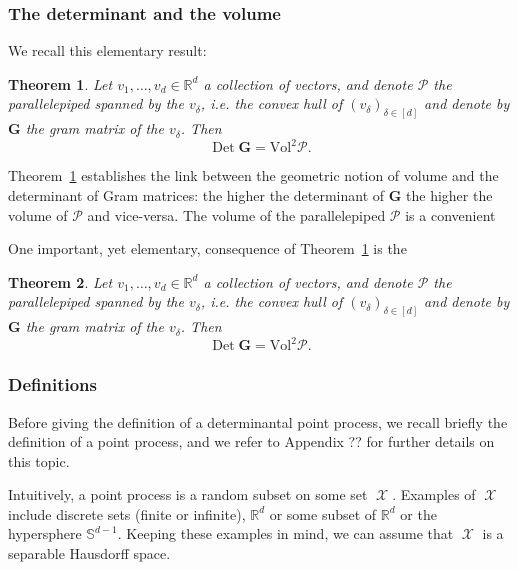 \documentclass[twoside,11pt]{book}
\newtheorem{theorem}{Theorem}
\DeclareMathOperator{\Det}{Det}
\DeclareMathOperator{\X}{\mathcal{X}}
\begin{document}
\subsubsection{The determinant and the volume}
We recall this elementary result:
\begin{theorem}\label{thm:link_det_vol}
Let $v_{1}, \dots, v_{d} \in \mathbb{R}^{d}$ a collection of vectors, and denote $\mathcal{P}$ the parallelepiped spanned by the $v_{\delta}$, i.e. the convex hull of $(v_{\delta})_{\delta \in [d]}$ and denote by $\bm{G}$ the gram matrix of the $v_{\delta}$. Then
\begin{equation}
\Det \bm{G} = \mathrm{Vol}^{2} \mathcal{P}. \nonumber
\end{equation}
\end{theorem}
Theorem~\ref{thm:link_det_vol} establishes the link between the geometric notion of volume and the determinant of Gram matrices: the higher the determinant of $\bm{G}$ the higher the volume of $\mathcal{P}$ and vice-versa. The volume of the parallelepiped $\mathcal{P}$ is a convenient 

One important, yet elementary, consequence of Theorem~\ref{thm:link_det_vol} is the 


\begin{theorem}\label{thm:vol_base_times_height}
Let $v_{1}, \dots, v_{d} \in \mathbb{R}^{d}$ a collection of vectors, and denote $\mathcal{P}$ the parallelepiped spanned by the $v_{\delta}$, i.e. the convex hull of $(v_{\delta})_{\delta \in [d]}$ and denote by $\bm{G}$ the gram matrix of the $v_{\delta}$. Then
\begin{equation}
\Det \bm{G} = \mathrm{Vol}^{2} \mathcal{P}. \nonumber
\end{equation}
\end{theorem}






\subsubsection{Definitions}
Before giving the definition of a determinantal point process, we recall briefly the definition of a point process, and we refer to Appendix ?? for further details on this topic.

Intuitively, a point process is a random subset on some set $\X$. Examples of $\X$ include discrete sets (finite or infinite), $\mathbb{R}^{d}$ or some subset of $\mathbb{R}^{d}$ or the hypersphere $\mathbb{S}^{d-1}$. Keeping these examples in mind, we can assume that $\X$ is a separable Hausdorff space.
\end{document}
